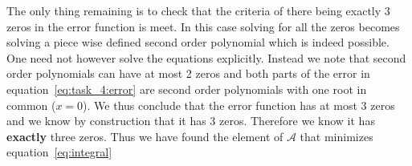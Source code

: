 \begin{solution}
The only thing remaining is to check that the criteria of there being
exactly 3 zeros in the error function is meet. In this case solving
for all the zeros becomes solving a piece wise defined second order
polynomial which is indeed possible. One need not however solve the
equations explicitly. Instead we note that second order polynomials
can have at most 2 zeros and both parts of the error in
equation~\ref{eq:task_4:error} are second order polynomials with one
root in common ($x = 0$). We thus conclude that the error function has
at most 3 zeros and we know by construction that it has 3
zeros. Therefore we know it has {\bf exactly } three zeros. Thus we
have found the element of $\mathcal{A}$ that minimizes
equation~\ref{eq:integral}

    

\end{solution}


